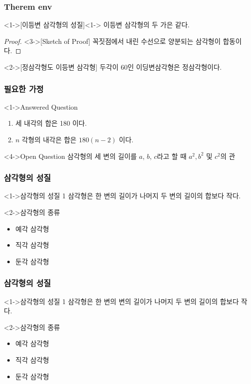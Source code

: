 \documentclass{beamer}
\begin{document}
\begin{frame}
\frametitle{Therem env}
\begin{theorem}<1->[이등변 삼각형의 성질]<1->
이등변 삼각형의 두 가은 같다.
\end{theorem}
\begin{proof}<3->[Sketch of Proof]
꼭짓점에서 내린 수선으로 양분되는 삼각형이 합동이다.
\end{proof}
\begin{example}<2->[정삼각형도 이등변 삼각형]
두각이 60인 이딩변삼각형은 정삼각형이다.
\end{example}
\end{frame}

\begin{frame}
\frametitle{필요한 가정}
\begin{block}<1->{Answered Question}
\begin{enumerate}
\item<2-> 세 내각의 합은 180 이다.
\item<3-> $n$ 각형의 내각은 합은 $180(n-2)$ 이다.
\end{enumerate}
\end{block}
\begin{block}<4->{Open Question}
삼각형의 세 변의 길이를 $a$, $b$, $c$라고 할 때 $a^2, b^2$ 및 $c^2$의 관
\end{block}
\end{frame}

\begin{frame}
\frametitle{삼각형의 성질}
\begin{block}<1->{삼각형의 성질 1}
\alert{삼각형}은 한 변의 길이가 나머지 두 변의 길이의 합보다 작다.
\end{block}

\begin{block}<2->{삼각형의 종류}
\begin{itemize}
\item<2-> 예각 삼각형
\item<3-> 직각 삼각형
\item<4-> 둔각 삼각형
\end{itemize}
\end{block}
\end{frame}

\begin{frame}
\frametitle{삼각형의 성질}
\begin{block}<1->{삼각형의 성질 1}
\alert{삼각형}은 한 변의 변의 길이가 나머지 두 변의 길이의 합보다 작다.
\end{block}

\begin{block}<2->{삼각형의 종류}
\begin{itemize}
\item<2-> 예각 삼각형
\item<3-> 직각 삼각형
\item<4-> 둔각 삼각형
\end{itemize}
\end{block}
\end{frame}
\end{document}
